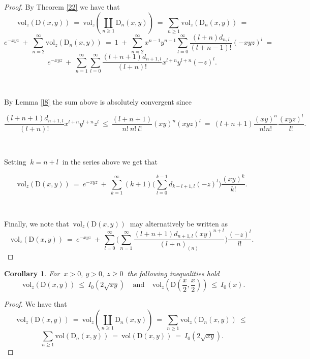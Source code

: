 \documentclass[10pt,leqeq]{article}
\newtheorem{cor}[thm]{Corollary}%
\begin{document}
\begin{proof} By Theorem \ref{22} we have that
$$ \ \mathrm{vol}_z(\mathrm{D}(x,y)) \ = \  
\mathrm{vol}_z(\coprod_{n\geq 1}\mathrm{D}_n(x,y)) \ = \ 
 \sum_{n\geq 1}\mathrm{vol}_z(\mathrm{D}_n(x,y))
 \ = $$ 
 $$e^{-xyz} \ + \ \sum_{n=2}^{\infty}\mathrm{vol}_z(\mathrm{D}_n(x,y))\ = \
1 \ + \ \sum_{n=2}^{\infty}x^{n-1}y^{n-1}\sum_{l=0}^{\infty} \frac{(l+n)d_{n,l}}{(l+n-1)!} (-xyz)^l \ = $$
$$e^{-xyz} \ + \ \sum_{n=1}^{\infty}\sum_{l=0}^{\infty} \frac{(l+n+1)d_{n+1,l}}{(l+n)!}  x^{l+n}y^{l+n}(-z)^l.$$

\

\noindent  By Lemma \ref{l8} the sum above is absolutely convergent since

$$\frac{(l+n+1)d_{n+1,l}}{(l+n)!}x^{l+n}y^{l+n}z^l
\ \leq \ \frac{(l+n+1)}{n!\ n! \ l!} 
 (xy)^{n}(xyz)^l \ = \ (l+n+1)
 \frac{(xy)^{n}}{n! n!}\frac{(xyz)^l}{l!}.$$

\



\noindent Setting $\ k=n+l \ $ in the series above we get that 

$$ \mathrm{vol}_z(\mathrm{D}(x,y)) \ = \  e^{-xyz} \ + \ \sum_{k=1}^{\infty}(k+1)\bigg(\sum_{l=0}^{k-1} d_{k-l+1,l}(-z)^l \bigg)\frac{(xy)^{k}}{k!}. $$

\

\noindent Finally, we note  that $ \ \mathrm{vol}_z(\mathrm{D}(x,y)) \ $ may alternatively be written as 
$$\mathrm{vol}_z(\mathrm{D}(x,y)) \ = \  e^{-xyz} \ + \ 
\sum_{l=0}^{\infty} \bigg( \sum_{n=1}^{\infty}
\frac{(l+n+1)d_{n+1,l}(xy)^{n+l}}{(l+n)_{(n)}}\bigg)\frac{(-z)^l}{ l!} .$$

\end{proof}


\begin{cor}
{\em For $\ x>0,\ y>0, \  z\geq 0 \ $ the following inequalities hold
$$\ \ \mathrm{vol}_z(\mathrm{D}(x,y)) \ \leq \  
I_0(2\sqrt{xy}) \ \ \ \ \  \mbox{and} \ \ \ \ \ 
  \mathrm{vol}_{z}(\mathrm{D}(\frac{x}{2},\frac{x}{2}))  \ \leq \ I_0(x). $$
}  
\end{cor}

\begin{proof} 
We have that
$$ \ \mathrm{vol}_z(\mathrm{D}(x,y)) \ = \  
\mathrm{vol}_z(\coprod_{n\geq 1}\mathrm{D}_n(x,y)) \ = \ 
 \sum_{n\geq 1}\mathrm{vol}_z(\mathrm{D}_n(x,y))
 \ \leq \ $$
 $$ \sum_{n\geq 1}\mathrm{vol}(\mathrm{D}_n(x,y)) \ = \
  \mathrm{vol}(\mathrm{D}(x,y)) \ = \  I_0(2\sqrt{xy}).$$



\end{proof}
\end{document}
